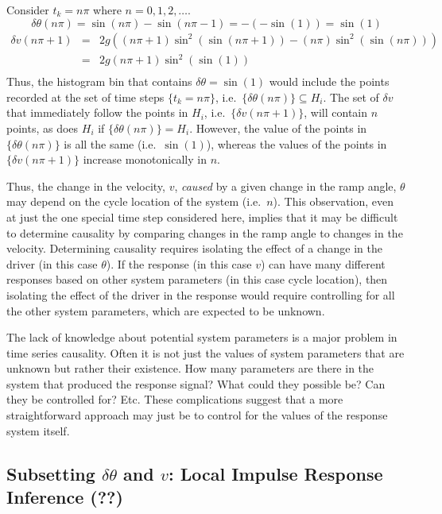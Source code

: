 \documentclass[a4paper,11pt]{article}
\begin{document}
Consider $t_k = n\pi$ where $n=0,1,2,\ldots$.  
$$
\delta\theta(n\pi) = \sin(n\pi) - \sin(n\pi-1) = -\left(-\sin(1)\right) = \sin(1)
$$
\begin{eqnarray*}
\delta v(n\pi+1) &=& 2g\left(\left(n\pi+1\right)\sin^2 \left(\sin(n\pi+1)\right) - \left(n\pi\right)\sin^2 \left(\sin(n\pi)\right) \right)\\
&=& 2g\left(n\pi+1\right)\sin^2 \left(\sin(1)\right)\\
\end{eqnarray*}
Thus, the histogram bin that contains $\delta\theta = \sin(1)$ would include the points recorded at the set of time steps $\{t_k = n\pi\}$, i.e.\ $\{\delta\theta(n\pi)\}\subseteq H_i$.  The set of $\delta v$ that immediately follow the points in $H_i$, i.e.\ $\{\delta v(n\pi+1)\}$, will contain $n$ points, as does $H_i$ if $\{\delta\theta(n\pi)\}= H_i$.  However, the value of the points in $\{\delta\theta(n\pi)\}$ is all the same (i.e.\ $\sin(1)$), whereas the values of the points in $\{\delta v(n\pi+1)\}$ increase monotonically in $n$.  

Thus, the change in the velocity, $v$, {\em caused} by a given change in the ramp angle, $\theta$ may depend on the cycle location of the system (i.e.\ $n$).  This observation, even at just the one special time step considered here, implies that it may be difficult to determine causality by comparing changes in the ramp angle to changes in the velocity.  Determining causality requires isolating the effect of a change in the driver (in this case $\theta$).  If the response (in this case $v$) can have many different responses based on other system parameters (in this case cycle location), then isolating the effect of the driver in the response would require controlling for all the other system parameters, which are expected to be unknown.

The lack of knowledge about potential system parameters is a major problem in time series causality.  Often it is not just the values of system parameters that are unknown but rather their existence.  How many parameters are there in the system that produced the response signal?  What could they possible be?  Can they be controlled for? Etc.  These complications suggest that a more straightforward approach may just be to control for the values of the response system itself.  

\subsection{Subsetting $\delta\theta$ and $v$: Local Impulse Response Inference (??)}
\end{document}
